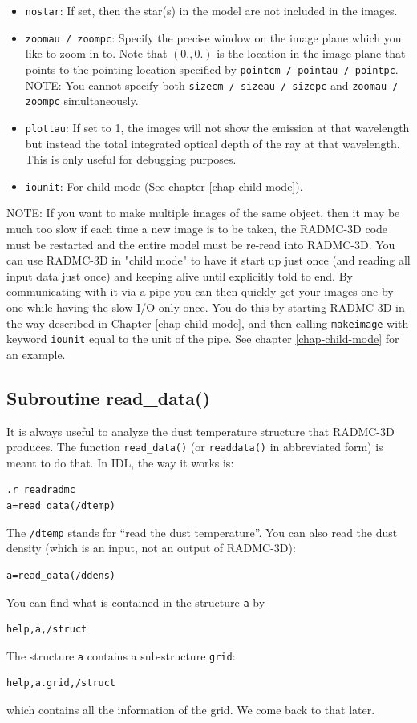 \documentclass{report}
\begin{document}
\begin{itemize}
  {\small\tt ifreq} simultaneously.
\item[] {\small\tt nostar}: If set, then the star(s) in the model are not included
  in the images. 
\item[] {\small\tt zoomau / zoompc}: Specify the precise window on the image plane
  which you like to zoom in to. Note that $(0.,0.)$ is the location in the
  image plane that points to the pointing location specified by 
  {\small\tt pointcm / pointau / pointpc}.
  NOTE: You cannot specify both {\small\tt sizecm / sizeau / sizepc} and 
  {\small\tt zoomau / zoompc} simultaneously.
\item[] {\small\tt plottau}: If set to 1, the images will not show the emission
  at that wavelength but instead the total integrated optical depth of the
  ray at that wavelength. This is only useful for debugging purposes.
\item[] {\small\tt iounit}: For child mode (See chapter \ref{chap-child-mode}).
\end{itemize}

NOTE: If you want to make multiple images of the same object, then it may be
much too slow if each time a new image is to be taken, the RADMC-3D code
must be restarted and the entire model must be re-read into RADMC-3D. You
can use RADMC-3D in "child mode" to have it start up just once (and reading
all input data just once) and keeping alive until explicitly told to end. 
By communicating with it via a pipe you can then quickly get your images
one-by-one while having the slow I/O only once. You do this by starting
RADMC-3D in the way described in Chapter \ref{chap-child-mode}, and then
calling {\small\tt makeimage} with keyword {\small\tt iounit} equal to the unit of
the pipe. See chapter \ref{chap-child-mode} for an example.

\subsection{Subroutine read\_data()}
\label{sec-idl-read-data}
%
It is always useful to analyze the dust temperature structure that RADMC-3D
produces. The function {\small\tt read\_data()} (or {\small\tt readdata()}
in abbreviated form) is meant to do that. In IDL, the way it works is:
{\small\begin{verbatim}
.r readradmc
a=read_data(/dtemp)
\end{verbatim}}
The {\small\tt /dtemp} stands for ``read the dust temperature''. You can
also read the dust density (which is an input, not an output of RADMC-3D):
{\small\begin{verbatim}
a=read_data(/ddens)
\end{verbatim}}
You can find what is contained in the structure {\small\tt a} by
{\small\begin{verbatim}
help,a,/struct
\end{verbatim}}
The structure {\small\tt a} contains a sub-structure {\small\tt grid}:
{\small\begin{verbatim}
help,a.grid,/struct
\end{verbatim}}
which contains all the information of the grid. We come back to that
later.
\end{document}
